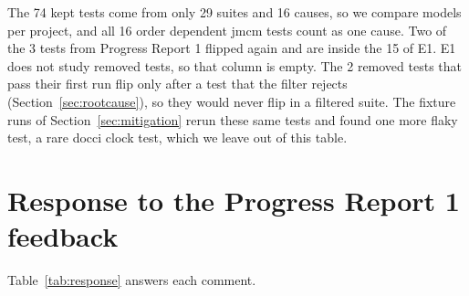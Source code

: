 \documentclass[sigconf,nonacm]{acmart}
\begin{document}
The 74 kept tests come from only 29 suites and 16 causes, so we compare models per project, and all 16 order dependent jmcm tests count as one cause. Two of the 3 tests from Progress Report 1 flipped again and are inside the 15 of E1. E1 does not study removed tests, so that column is empty. The 2 removed tests that pass their first run flip only after a test that the filter rejects (Section~\ref{sec:rootcause}), so they would never flip in a filtered suite. The fixture runs of Section~\ref{sec:mitigation} rerun these same tests and found one more flaky test, a rare docci clock test, which we leave out of this table.

\section{Response to the Progress Report 1 feedback}
Table~\ref{tab:response} answers each comment.
\end{document}
